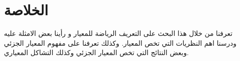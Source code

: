 \chapter*{الخلاصة}

\begin{doublespacing}
تعرفنا من خلال هذا البحث على التعريف الرياضة للمعيار و رأينا بعض الامثلة عليه ودرسنا اهم النظريات التي تخص المعيار. وكذلك تعرفنا على مفهوم المعيار الجزئي وبعض النتائج التي تخص المعيار الجزئي وكذلك التشاكل المعياري. 
\end{doublespacing}